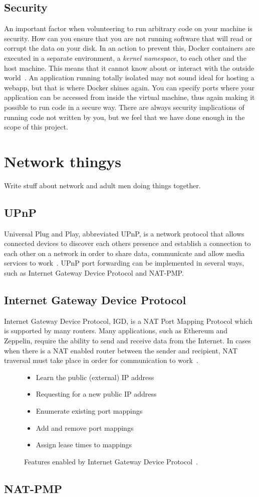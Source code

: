 \subsection{Security}
An important factor when volunteering to run arbitrary code on your machine is security. 
How can you ensure that you are not running software that will read or corrupt the data on your disk. 
In an action to prevent this, Docker containers are executed in a separate environment, a \emph{kernel namespace}, to each other and the host machine. This means that it cannot know about or interact with the outside world~\cite{docker-security}. An application running totally isolated may not sound ideal for hosting a webapp, but that is where Docker shines again. You can specify ports where your application can be accessed from inside the virtual machine, thus again making it possible to run code in a secure way.
There are always security implications of running code not written by you, but we feel that we have done enough in the scope of this project.

\section{Network thingys}
Write stuff about network and adult men doing things together.

\subsection{UPnP}
Universal Plug and Play, abbreviated UPnP, is a network protocol that allows connected devices to discover each others presence and establish a connection to each other on a network in order to share data, communicate and allow media services to work~\cite{upnp}. UPnP port forwarding can be implemented in several ways, such as Internet Gateway Device Protocol and NAT-PMP. 

\subsection{Internet Gateway Device Protocol}
Internet Gateway Device Protocol, IGD, is a NAT Port Mapping Protocol which is supported by many routers. Many applications, such as Ethereum and Zeppelin, require the ability to send and receive data from the Internet. In cases when there is a NAT enabled router between the sender and recipient, NAT traversal must take place in order for communication to work~\cite{igd:main}.

\begin{figure}
\centering
\begin{itemize}
    \item Learn the public (external) IP address
    \item Requesting for a new public IP address
    \item Enumerate existing port mappings
    \item Add and remove port mappings
    \item Assign lease times to mappings
\end{itemize}
\caption{Features enabled by Internet Gateway Device Protocol~\cite{igd:list}.}
\label{fig:igd}
\end{figure}

\subsection{NAT-PMP}
